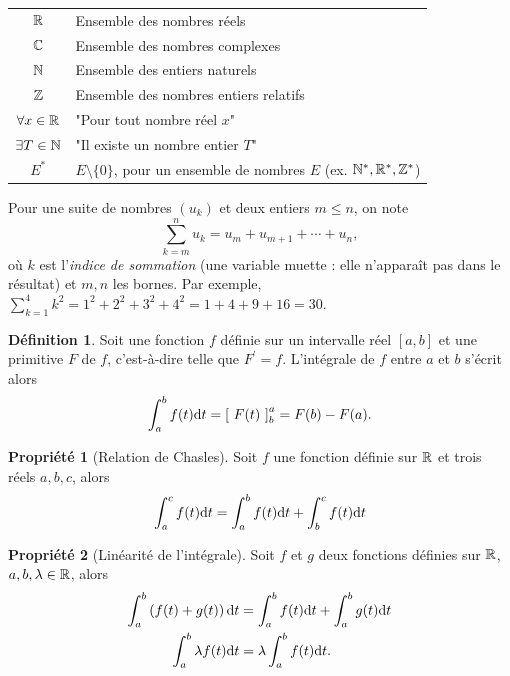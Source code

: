 \documentclass[a4paper,11pt]{article}
\theoremstyle{definition}
\newtheorem{definition}{Définition}[section]
\newtheorem{proposition}{Propriété}[section]
\newcommand{\highlight}[1]{{\color{niceblue}\emph{#1}}}
\begin{document}
    \begin{tabular}{cl}
        ${\mathbb{R}}$ & Ensemble des nombres réels \\
        ${\mathbb{C}}$ & Ensemble des nombres complexes \\
        ${\mathbb{N}}$ & Ensemble des entiers naturels \\
        ${\mathbb{Z}}$ & Ensemble des nombres entiers relatifs \\
        $\forall x\in{\mathbb{R}}$ & "Pour tout nombre réel $x$" \\
        $\exists T\in{\mathbb{N}}$ & "Il existe un nombre entier $T$" \\
        $E^*$ & $E\setminus\{0\}$, pour un ensemble de nombres $E$ (ex. ${\mathbb{N}}^*,{\mathbb{R}}^*,{\mathbb{Z}}^*$) \\

    \end{tabular}


Pour une suite de nombres $(u_k)$ et deux entiers $m\leq n$, on note
$$
    \sum_{k=m}^{n} u_k = u_m + u_{m+1} + \cdots + u_n,
$$
où $k$ est l'\highlight{indice de sommation} (une variable muette : elle n'apparaît pas dans le résultat) et $m,n$ les bornes. Par exemple, $\sum_{k=1}^{4} k^2 = 1^2+2^2+3^2+4^2 = 1+4+9+16 = 30$.


\begin{definition}
    Soit une fonction $f$ définie sur un intervalle réel $[a,b]$ et une primitive $F$ de $f$, c'est-à-dire telle que
    $F^\prime = f$. L'intégrale de $f$ entre $a$ et $b$ s'écrit alors
    $$
    \int_{a}^{b} f(t){\rm d} t = \left[\ F(t)\ \right]_b^a = F(b) - F(a).
    $$
\end{definition}

\begin{proposition}[Relation de Chasles]
    Soit $f$ une fonction définie sur ${\mathbb{R}}$ et trois réels $a,b,c$, alors
    $$
    \int_{a}^{c} f(t){\rm d} t = \int_{a}^{b} f(t){\rm d} t + \int_{b}^{c} f(t){\rm d} t
    $$
\end{proposition}

\begin{proposition}[Linéarité de l'intégrale]
    Soit $f$ et $g$ deux fonctions définies sur ${\mathbb{R}}$, $a,b, \lambda\in{\mathbb{R}}$, alors
    $$
    \begin{aligned}
        \int_a^b \left(f(t) + g(t)\right){\rm d} t &= \int_a^b f(t) {\rm d} t + \int_{a}^{b} g(t) {\rm d} t \\
        \int_a^b \lambda f(t){\rm d} t &= \lambda \int_a^b f(t) {\rm d} t.
    \end{aligned}
    $$
\end{proposition}
\end{document}
